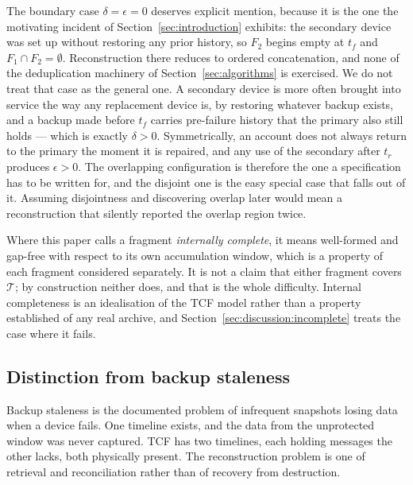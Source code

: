 The boundary case $\delta = \epsilon = 0$ deserves explicit mention, because it
is the one the motivating incident of Section~\ref{sec:introduction} exhibits:
the secondary device was set up without restoring any prior history, so $F_2$
begins empty at $t_f$ and $F_1 \cap F_2 = \emptyset$. Reconstruction there
reduces to ordered concatenation, and none of the deduplication machinery of
Section~\ref{sec:algorithms} is exercised. We do not treat that case as the
general one. A secondary device is more often brought into service the way any
replacement device is, by restoring whatever backup exists, and a backup made
before $t_f$ carries pre-failure history that the primary also still holds ---
which is exactly $\delta > 0$. Symmetrically, an account does not always return
to the primary the moment it is repaired, and any use of the secondary after
$t_r$ produces $\epsilon > 0$. The overlapping configuration is therefore the
one a specification has to be written for, and the disjoint one is the easy
special case that falls out of it. Assuming disjointness and discovering
overlap later would mean a reconstruction that silently reported the overlap
region twice.

Where this paper calls a fragment \emph{internally complete}, it means
well-formed and gap-free with respect to its own accumulation window, which is
a property of each fragment considered separately. It is not a claim that
either fragment covers $\mathcal{T}$; by construction neither does, and that
is the whole difficulty. Internal completeness is an idealisation of the TCF
model rather than a property established of any real archive, and
Section~\ref{sec:discussion:incomplete} treats the case where it fails.

\subsection{Distinction from backup staleness}
\label{sec:tcf:staleness}

Backup staleness is the documented problem of infrequent snapshots losing data
when a device fails. One timeline exists, and the data from the unprotected
window was never captured. TCF has two timelines, each holding messages the other
lacks, both physically present. The reconstruction problem is one of retrieval
and reconciliation rather than of recovery from destruction.

